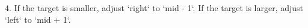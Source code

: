 \documentclass[preview]{standalone}
\begin{document}
4. If the target is smaller, adjust `right` to `mid - 1`. If the target is larger, adjust `left` to `mid + 1`.\\
\end{document}
